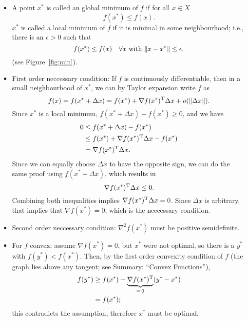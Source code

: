 \documentclass{article}
\begin{document}
\begin{itemize}
\item A point \(x^*\) is called an global minimum of \(f\) if for all \(x \in X\)
  \begin{equation*}
    f(x^*) \leq f(x).
  \end{equation*}
  \(x^*\) is called a local minimum of \(f\) if it is minimal in some neighbourhood; i.e., there is
  an \(\epsilon > 0\) such that
  \begin{equation*}
    f(x^*) \leq f(x) \quad \forall x \text{ with } \enVert{x - x^*} \leq \epsilon.
  \end{equation*}
  (see Figure~\ref{fig:min}).
\item First order neccessary condition: If \(f\) is continuously differentiable, then in a small
  neighbourhood of \(x^*\), we can by Taylor expansion write \(f\) as
  \begin{equation*}
    f(x) = f(x^* + \Delta x) = f(x^*) + \nabla f(x^*)^{\mathrm{T}} \Delta x + o(\lVert \Delta x \rVert).
  \end{equation*}
  Since \(x^*\) is a local minimum, \(f(x^* + \Delta x) - f(x^*) \geq 0\), and we have
  \begin{align*}
    0 &\leq f(x^* + \Delta x) - f(x^*) \\
      &\leq f(x^*) + \nabla f(x^*)^{\mathrm{T}} \Delta x - f(x^*) \\
      &= \nabla f(x^*)^{\mathrm{T}} \Delta x.
  \end{align*}
  Since we can equally choose \(\Delta x\) to have the opposite sign, we can do the same proof using
  \(f(x^* - \Delta x)\), which results in
  \begin{equation*}
    \nabla f(x^*)^{\mathrm{T}} \Delta x \leq 0.
  \end{equation*}
  Combining both inequalities implies \(\nabla f(x^*)^{\mathrm{T}} \Delta x = 0\).  Since \(\Delta x\) is
  arbitrary, that implies that \(\nabla f(x^*) = 0\), which is the neccessary condition.
\item Second order neccessary condition: \(\nabla^2 f(x^*)\) must be positive semidefinite.
\item For \(f\) convex: assume \(\nabla f(x^*) = 0\), but \(x^*\) were not optimal, so there is a
  \(y^*\) with \(f(y^*) < f(x^*)\).  Then, by the first order convexity condition of \(f\) (the
  graph lies above any tangent; see Summary: ``Convex Functions''),
\begin{align*}
  f(y^*) &\geq f(x^*) + \underbrace{\nabla f(x^*)^{\mathrm{T}}}_{=\, 0}(y^* - x^*) \\
         &= f(x^*);
\end{align*}
this contradicts the assumption, therefore \(x^*\) must be optimal.
\end{itemize}
\end{document}
